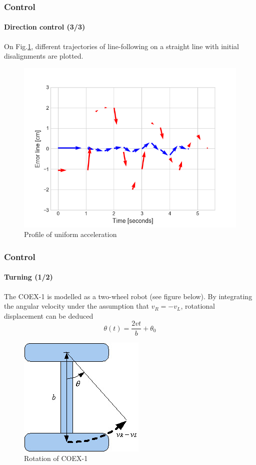 \documentclass[10pt]{beamer}
\begin{document}
\begin{frame}
\frametitle{Control}
\framesubtitle{Direction control (3/3)}
On Fig.\ref{fig:perturbation}, different trajectories of line-following on a straight line with initial disalignments are plotted.
\begin{figure}[hbtp]
\centering
\label{fig:perturbation}
\includegraphics[scale=0.45]{figures/perturbation}
\caption{Profile of uniform acceleration}
\end{figure}
\end{frame}


\begin{frame}[label={frame:control-turn}]
\frametitle{Control}
\framesubtitle{Turning (1/2)}
The COEX-1 is modelled as a two-wheel robot (see figure below). By integrating the angular velocity under the assumption that $v_R = -v_L$, rotational displacement can be deduced
\begin{equation}\label{eq:theta-turn}
\theta(t) = \frac{2vt}{b} + \theta_0
\end{equation}
\begin{figure}[hbtp]
\centering
\label{fig:model-turn}
\includegraphics[scale=0.45]{figures/differential-system.jpg}
\caption{Rotation of COEX-1}
\end{figure}
\end{frame}
\end{document}
